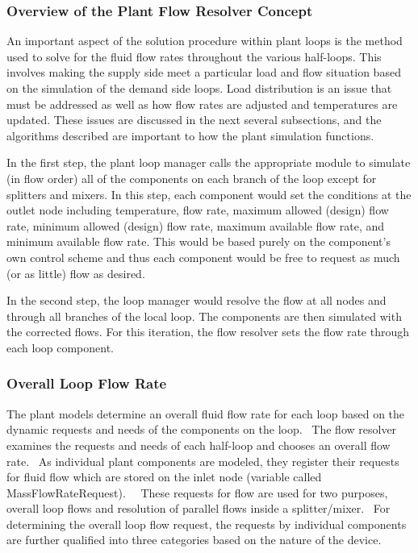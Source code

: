 \subsubsection{Overview of the Plant Flow Resolver Concept}\label{overview-of-the-plant-flow-resolver-concept}

An important aspect of the solution procedure within plant loops is the method used to solve for the fluid flow rates throughout the various half-loops. This involves making the supply side meet a particular load and flow situation based on the simulation of the demand side loops. Load distribution is an issue that must be addressed as well as how flow rates are adjusted and temperatures are updated. These issues are discussed in the next several subsections, and the algorithms described are important to how the plant simulation functions.

In the first step, the plant loop manager calls the appropriate module to simulate (in flow order) all of the components on each branch of the loop except for splitters and mixers. In this step, each component would set the conditions at the outlet node including temperature, flow rate, maximum allowed (design) flow rate, minimum allowed (design) flow rate, maximum available flow rate, and minimum available flow rate. This would be based purely on the component's own control scheme and thus each component would be free to request as much (or as little) flow as desired.

In the second step, the loop manager would resolve the flow at all nodes and through all branches of the local loop. The components are then simulated with the corrected flows. For this iteration, the flow resolver sets the flow rate through each loop component.

\subsubsection{Overall Loop Flow Rate}\label{overall-loop-flow-rate}

The plant models determine an overall fluid flow rate for each loop based on the dynamic requests and needs of the components on the loop.~ The flow resolver examines the requests and needs of each half-loop and chooses an overall flow rate.~ As individual plant components are modeled, they register their requests for fluid flow which are stored on the inlet node (variable called MassFlowRateRequest).~~ These requests for flow are used for two purposes, overall loop flows and resolution of parallel flows inside a splitter/mixer.~ For determining the overall loop flow request, the requests by individual components are further qualified into three categories based on the nature of the device.

